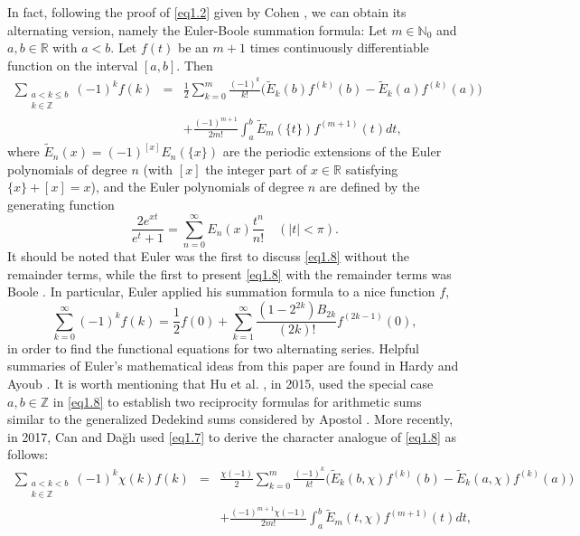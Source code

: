 \documentclass[reqno]{amsart}
\numberwithin{equation}{section}
\begin{document}
In fact, following the proof of \eqref{eq1.2} given by Cohen \cite[Theorem 9.2.2]{cohen}, we can obtain its alternating version, namely the Euler-Boole summation formula: Let $m\in\mathbb{N}_{0}$ and $a,b\in\mathbb{R}$ with $a<b$. Let $f(t)$ be an $m+1$ times continuously differentiable function on the interval $[a,b]$. Then
\begin{eqnarray}\label{eq1.8}
\sum_{\substack{a<k\leqslant b\\k\in\mathbb{Z}}}(-1)^{k}f(k)&=&\frac{1}{2}\sum_{k=0}^{m}\frac{(-1)^{k}}{k!}\bigl(\widetilde{E}_{k}(b)f^{(k)}(b)-\widetilde{E}_{k}(a)f^{(k)}(a)\bigl)\nonumber\\
&&+\frac{(-1)^{m+1}}{2m!}\int_{a}^{b}\widetilde{E}_{m}(\{t\})f^{(m+1)}(t)d t,
\end{eqnarray}
where $\widetilde{E}_{n}(x)=(-1)^{[x]}E_{n}(\{x\})$ are the periodic extensions of the Euler polynomials of degree $n$ (with $[x]$ the integer part of $x\in\mathbb{R}$ satisfying $\{x\}+[x]=x$), and the Euler polynomials of degree $n$ are defined by the generating function
\begin{equation}\label{eq1.9}
\frac{2e^{xt}}{e^{t}+1}=\sum_{n=0}^{\infty}E_{n}(x)\frac{t^{n}}{n!}\quad(|t|<\pi).
\end{equation}
It should be noted that Euler \cite{euler3} was the first to discuss \eqref{eq1.8} without the remainder terms, while the first to present \eqref{eq1.8} with the remainder terms was Boole \cite{boole}. In particular, Euler \cite{euler5} applied his summation formula to a nice function $f$,
\begin{equation}\label{eq1.10}
\sum_{k=0}^{\infty}(-1)^{k}f(k)=\frac{1}{2}f(0)+\sum_{k=1}^{\infty}\frac{(1-2^{2k})B_{2k}}{(2k)!}f^{(2k-1)}(0),
\end{equation}
in order to find the functional equations for two alternating series. Helpful summaries of Euler's mathematical ideas from this paper are found in Hardy \cite[Chapter 2]{hardy2} and Ayoub \cite{ayoub}. It is worth mentioning that Hu et al. \cite{hu}, in 2015, used the special case $a,b\in\mathbb{Z}$ in \eqref{eq1.8} to establish two reciprocity formulas for arithmetic sums similar to the generalized Dedekind sums considered by Apostol \cite{apostol1}. More recently, in 2017, Can and Da\u{g}l{\i} \cite[Theorem 1.3]{can} used \eqref{eq1.7} to derive the character analogue of \eqref{eq1.8} as follows:
\begin{eqnarray}\label{eq1.11}
\sum_{\substack{a<k< b\\k\in\mathbb{Z}}}(-1)^{k}\chi(k)f(k)&=&\frac{\chi(-1)}{2}\sum_{k=0}^{m}\frac{(-1)^{k}}{k!}\bigl(\widetilde{E}_{k}(b,\chi)f^{(k)}(b)-\widetilde{E}_{k}(a,\chi)f^{(k)}(a)\bigl)\nonumber\\
&&+\frac{(-1)^{m+1}\chi(-1)}{2m!}\int_{a}^{b}\widetilde{E}_{m}(t,\chi)f^{(m+1)}(t)d t,
\end{eqnarray}
\end{document}
